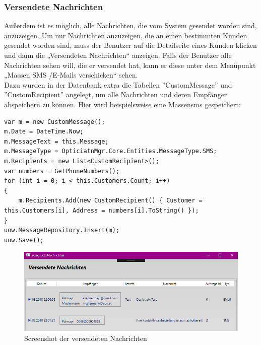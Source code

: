 \subsubsection{Versendete Nachrichten}
Außerdem ist es möglich, alle Nachrichten, die vom System gesendet worden sind, anzuzeigen. Um nur Nachrichten anzuzeigen, die an einen bestimmten Kunden gesendet worden sind, muss der Benutzer auf die Detailseite eines Kunden klicken und dann die „Versendeten Nachrichten“ anzeigen. Falls der Benutzer alle Nachrichten sehen will, die er versendet hat, kann er diese unter dem Menüpunkt „Massen SMS /E-Mails verschicken“ sehen.\\
Dazu wurden in der Datenbank extra die Tabellen ''CustomMessage'' und ''CustomRecipient'' angelegt, um alle Nachrichten und deren Empfänger abspeichern zu können. Hier wird beispielsweise eine Massensms gespeichert:
\begin{lstlisting}
var m = new CustomMessage();
m.Date = DateTime.Now;
m.MessageText = this.Message;
m.MessageType = OpticiatnMgr.Core.Entities.MessageType.SMS;
m.Recipients = new List<CustomRecipient>();
var numbers = GetPhoneNumbers();
for (int i = 0; i < this.Customers.Count; i++)
{
	m.Recipients.Add(new CustomRecipient() { Customer = this.Customers[i], Address = numbers[i].ToString() });
}
uow.MessageRepository.Insert(m);
uow.Save();
\end{lstlisting}\bigskip
\begin{figure}[H]
\begin{center}
	\includegraphics[scale=.7]{images/VersendeteNachrichten.png}
\end{center}
	\caption{Screenshot der versendeten Nachrichten}
	\label{fig:sample}
\end{figure}
\bigskip
